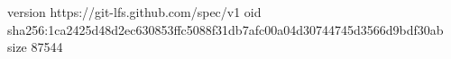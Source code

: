 version https://git-lfs.github.com/spec/v1
oid sha256:1ca2425d48d2ec630853ffc5088f31db7afc00a04d30744745d3566d9bdf30ab
size 87544
